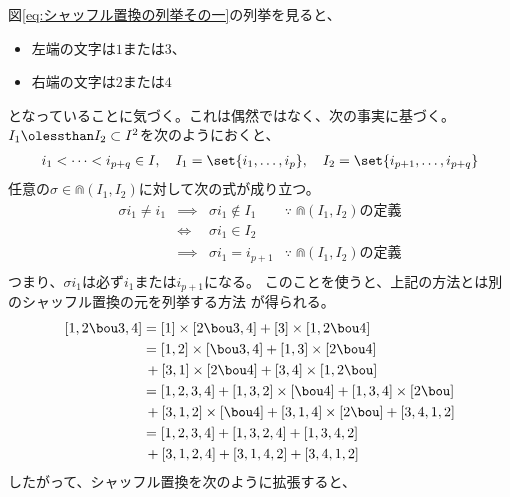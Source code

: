 {	図\eqref{eq:シャッフル置換の列挙その一}の列挙を見ると、
	\begin{itemize}\setlength{\itemsep}{-1mm} %
		\item 左端の文字は$1$または$3$、
		\item 右端の文字は$2$または$4$
	\end{itemize} %
	となっていることに気づく。これは偶然ではなく、次の事実に基づく。
	$I_1\oless I_2\subset I^2$を次のようにおくと、
	\begin{equation*}\begin{split}
		i_1<\cdots< i_{p+q} \in I
		,\quad I_1 = \set{i_1,\dots,i_p}
		,\quad I_2 = \set{i_{p+1},\dots,i_{p+q}}
	\end{split}\end{equation*}
	任意の$\sigma\in\Cap(I_1,I_2)$に対して次の式が成り立つ。
	\begin{equation*}\begin{array}{rcll}
		\sigma i_1 \neq i_1 &\implies& \sigma i_1\not\in I_1
		& \because\; \text{$\Cap(I_1,I_2)$の定義} \\
		&\iff& \sigma i_1\in I_2 \\
		&\implies& \sigma i_1 = i_{p+1}
		& \because\; \text{$\Cap(I_1,I_2)$の定義} \\
	\end{array}\end{equation*}
	つまり、$\sigma i_1$は必ず$i_1$または$i_{p+1}$になる。
	このことを使うと、上記の方法とは別のシャッフル置換の元を列挙する方法
	が得られる。
	\begin{equation*}\begin{split}
		[1,2\bou 3,4] &= [1]\times[2\bou 3,4] + [3]\times[1,2\bou 4] \\
		&= [1,2]\times[\bou 3,4] + [1,3]\times[2\bou 4] \\
		&\,+ [3,1]\times[2\bou 4] + [3,4]\times[1,2\bou] \\
		&= [1,2,3,4] + [1,3,2]\times[\bou 4] + [1,3,4]\times[2\bou] \\
		&\,+ [3,1,2]\times[\bou 4] + [3,1,4]\times[2\bou] + [3,4,1,2] \\
		&= [1,2,3,4] + [1,3,2,4] + [1,3,4,2] \\
		&\,+ [3,1,2,4] + [3,1,4,2] + [3,4,1,2] \\
	\end{split}\end{equation*}
	したがって、シャッフル置換を次のように拡張すると、
	\begin{equation}\label{eq:シャッフル置換の拡張}\begin{split}

\end{split}
\end{equation}}
